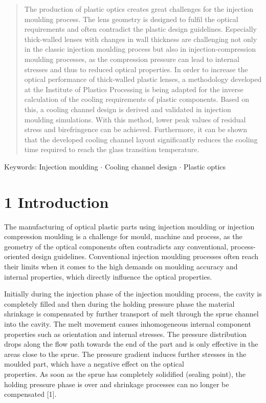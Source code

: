 \documentclass[10pt]{article}
\begin{document}
\begin{abstract}
The production of plastic optics creates great challenges for the injection moulding process. The lens geometry is designed to fulfil the optical requirements and often contradict the plastic design guidelines. Especially thick-walled lenses with changes in wall thickness are challenging not only in the classic injection moulding process but also in injection-compression moulding processes, as the compression pressure can lead to internal stresses and thus to reduced optical properties. In order to increase the optical performance of thick-walled plastic lenses, a methodology developed at the Institute of Plastics Processing is being adapted for the inverse calculation of the cooling requirements of plastic components. Based on this, a cooling channel design is derived and validated in injection moulding simulations. With this method, lower peak values of residual stress and birefringence can be achieved. Furthermore, it can be shown that the developed cooling channel layout significantly reduces the cooling time required to reach the glass transition temperature.
\end{abstract}

Keywords: Injection moulding $\cdot$ Cooling channel design $\cdot$ Plastic optics

\section*{1 Introduction}
The manufacturing of optical plastic parts using injection moulding or injection compression moulding is a challenge for mould, machine and process, as the geometry of the optical components often contradicts any conventional, process-oriented design guidelines. Conventional injection moulding processes often reach their limits when it comes to the high demands on moulding accuracy and internal properties, which directly influence the optical properties.

Initially during the injection phase of the injection moulding process, the cavity is completely filled and then during the holding pressure phase the material shrinkage is compensated by further transport of melt through the sprue channel into the cavity. The melt movement causes inhomogeneous internal component properties such as orientation and internal stresses. The pressure distribution drops along the flow path towards the end of the part and is only effective in the areas close to the sprue. The pressure gradient induces further stresses in the moulded part, which have a negative effect on the optical\\
properties. As soon as the sprue has completely solidified (sealing point), the holding pressure phase is over and shrinkage processes can no longer be compensated [1].
\end{document}
